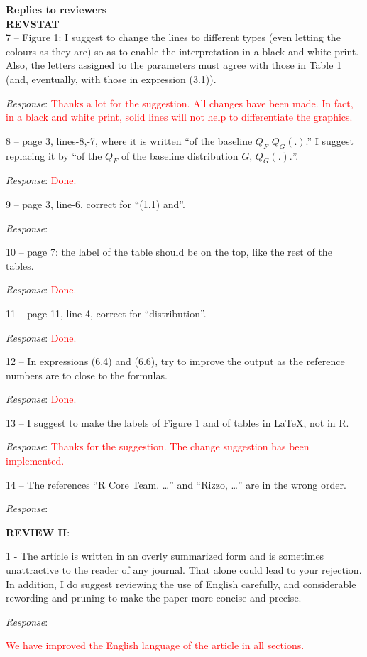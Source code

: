 \documentclass[version=last,12pt,{"maintainersDelight"},letterpaper,]{scrlttr2}
\begin{document}
\begin{letter}{\textbf{Replies to reviewers}\\\textbf{REVSTAT}\\}
7 -- Figure 1: I suggest to change the lines to different types (even letting the colours as they are) so as to enable the interpretation in a black and white print. Also, the letters assigned to the parameters must agree with those in Table 1 (and, eventually, with those in expression (3.1)).

\emph{Response}:
\textcolor{red}{Thanks a lot for the suggestion. All changes have been made. In fact, in a black and white print, solid lines will not help to differentiate the graphics.}

8 -- page 3, lines-8,-7, where it is written ``of the baseline \(Q_F\) \(Q_G(.)\).'' I suggest replacing it by ``of the \(Q_F\) of the baseline distribution \(G\), \(Q_G(.).\)''.

\emph{Response}: \textcolor{red}{Done.}

9 -- page 3, line-6, correct for ``(1.1) and''.

\emph{Response}:

10 -- page 7: the label of the table should be on the top, like the rest of the tables.

\emph{Response}: \textcolor{red}{Done.}

11 -- page 11, line 4, correct for ``distribution''.

\emph{Response}: \textcolor{red}{Done.}

12 -- In expressions (6.4) and (6.6), try to improve the output as the reference numbers are to close to the formulas.

\emph{Response}: \textcolor{red}{Done.}

13 -- I suggest to make the labels of Figure 1 and of tables in \LaTeX, not in R.

\emph{Response}:
\textcolor{red}{Thanks for the suggestion. The change suggestion has been implemented.}

14 -- The references ``R Core Team. \ldots{}'' and ``Rizzo, \ldots{}'' are in the wrong order.

\emph{Response}:

\textbf{REVIEW II}:

1 - The article is written in an overly summarized form and is sometimes unattractive to the reader of any journal. That alone could lead to your rejection. In addition, I do suggest reviewing the use of English carefully, and considerable rewording and pruning to make the paper more concise and precise.

\emph{Response}:

\textcolor{red}{We have improved the English language of the article in all sections.}


\end{letter}
\end{document}
